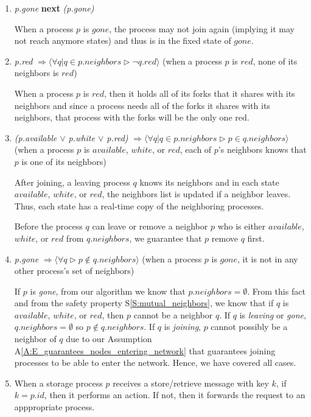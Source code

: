 \documentclass[11pt]{article}
\begin{document}
\begin{enumerate}[S1]
\item {\it p.gone} {\bfseries next} {\it (p.gone)}

When a process $p$ is $gone$, the process may not join again (implying it may not reach anymore states) and thus is in the fixed state of $gone$.

\item {\it p.red} $\Rightarrow \langle \forall q | q \in p.neighbors \rhd \neg q.red \rangle$
(when a process $p$ is $red$, none of its neighbors is $red$)

When a process $p$ is $red$, then it holds all of its forks that it shares with its neighbors and since a process needs all of the forks it shares with its neighbors, that process with the forks will be the only one red.


\item \label{S:mutual_neighbors} {\it (p.available $\vee$ p.white $\vee$ p.red)} $\Rightarrow \langle \forall q | q \in p.neighbors \rhd p \in q.neighbors \rangle$
(when a process $p$ is $available$, $white$, or $red$, each of $p$'s neighbors knows that $p$ is one of its neighbors)

After joining, a leaving process $q$ knows its neighbors and in each state $available$, $white$, or $red$, the neighbors list is updated if a neighbor leaves. Thus, each state has a real-time copy of the neighboring processes.

Before the process $q$ can leave or remove a neighbor $p$ who is either $available$, $white$, or $red$ from $q.neighbors$, we guarantee that $p$ remove $q$ first.

\item {\it p.gone} $\Rightarrow \langle \forall q  \rhd p\not\in q.neighbors \rangle$
(when a process $p$ is $gone$, it is not in any other process's set of neighbors)

If $p$ is \emph{gone}, from our algorithm we know that $p.neighbors = \emptyset$. From this fact and from the safety property S\ref{S:mutual_neighbors}, we know that if $q$ is $available$, $white$, or $red$, then $p$ cannot be a neighbor $q$. If $q$ is \emph{leaving} or \emph{gone}, $q.neighbors = \emptyset$ so $p\not\in q.neighbors.$ If $q$ is \emph{joining}, $p$ cannot possibly be a neighbor of $q$ due to our Assumption A\ref{A:E_guarantees_nodes_entering_network} that guarantees joining processes to be able to enter the network. Hence, we have covered all cases.



\item When a storage process $p$ receives a store/retrieve message with key $k$, if $k = p.id$, then it performs an action. If not, then it forwards the request to an apppropriate process.


\end{enumerate}
\end{document}
